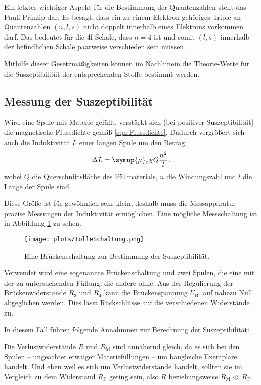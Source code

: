     Ein letzter wichtiger Aspekt für die Bestimmung der Quantenzahlen stellt das Pauli-Prinzip dar. 
    Es besagt, dass ein zu einem Elektron gehöriges Triple an Quantenzahlen $(n,l,s)$ nicht doppelt innerhalb eines Elektrons vorkommen darf. 
    Das bedeutet für die 4f-Schale, dass $n=4$ ist und somit $(l,s)$ innerhalb der befindlichen Schale paarweise verschieden sein müssen. 
    
    Mithilfe dieser Gesetzmäßigkeiten können im Nachhinein die Theorie-Werte für die Suszeptibilität der entsprechenden Stoffe bestimmt werden. 

\subsection{Messung der Suszeptibilität}
\label{sub:messmethode}

    Wird eine Spule mit Materie gefüllt, verstärkt sich (bei positiver Suszeptibilität) die magnetische Flussdichte gemäß \eqref{eqn:Flussdichte}. 
    Dadurch vergrößert sich auch die Induktivität $L$ einer langen Spule um den Betrag 
    \begin{equation}
        \Delta L=\symup{\mu}_0 \chi Q \frac{n^2}{l} \,,
    \end{equation}
    wobei $Q$ die Querschnittsfläche des Füllmaterials, $n$ die Windungszahl und $l$ die Länge der Spule  sind. 

    Diese Größe ist für gewöhnlich sehr klein, deshalb muss die Messapparatur präzise Messungen der Induktivität ermöglichen.
    Eine mögliche Messschaltung ist in Abbildung \ref{fig:TolleSchaltung} zu sehen.
    \begin{figure}
        \centering 
        \texttt{[image: plots/TolleSchaltung.png]}
        \caption{Eine Brückenschaltung zur Bestimmung der Suszeptibilität\cite{Versuchsanleitung}.}
        \label{fig:TolleSchaltung}
    \end{figure}
    Verwendet wird eine sogenannte Brückenschaltung und zwei Spulen, die eine mit der zu untersuchenden Füllung, 
    die andere ohne. 
    Aus der Regulierung der Brückenwiderstände $R_3$ und $R_4$ kann die Brückenspannung $U_\text{Br}$ auf nahezu Null abgeglichen werden. 
    Dies lässt Rückschlüsse auf die verschiedenen Widerstände zu. 

    In diesem Fall führen folgende Annahmnen zur Berechnung der Suszeptibilität:

    Die Verlustwiderstände $R$ und $R_\text{M}$ sind annähernd gleich, da es sich bei den Spulen -- ungeachtet etwaiger 
    Materiefüllungen -- um baugleiche Exemplare handelt. 
    Und eben weil es sich um Verlustwiderstände handelt, sollten sie im Vergleich zu dem Widerstand $R_\text{P}$ gering sein, 
    also $R$ beziehungsweise $R_\text{M}\ll R_\text{P}$. 

